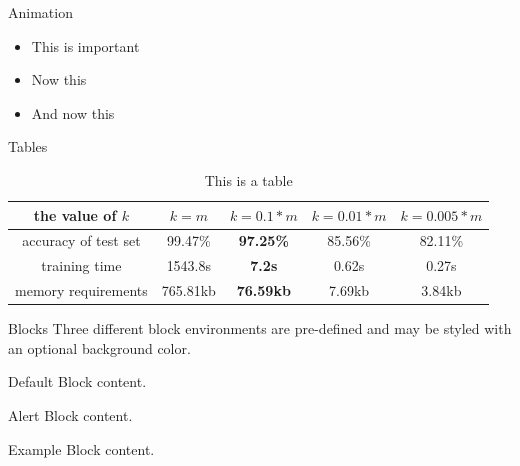 \documentclass[10pt]{beamer}
\begin{document}
\begin{frame}{Animation}
  \begin{itemize}[<+- | alert@+>] %
  
    \item This is important
    \item Now this
    \item And now this
    
  \end{itemize}
\end{frame}




\begin{frame}{Tables}
  
	\begin{table}[tbp]
	\centering  
	\begin{tabular}{c|c|c|c|c}
		\hline
		the value of $k$ &$k=m$ &$k=0.1*m$ &$k=0.01*m$ &$k=0.005*m$\\ 
		\hline  
		accuracy of test set &99.47\% &\textbf{97.25\%} &85.56\% &82.11\%\\     
		training time & 1543.8s &\textbf{7.2s} &0.62s & 0.27s \\
		memory requirements & 765.81kb & \textbf{76.59kb} & 7.69kb & 3.84kb \\    
		\hline
	\end{tabular}
	\caption{This is a table}
	\end{table}

\end{frame}



\begin{frame}{Blocks}
  Three different block environments are pre-defined and may be styled with an
  optional background color.


      \begin{block}{Default}
        Block content.
      \end{block}

      \begin{alertblock}{Alert}
        Block content.
      \end{alertblock}

      \begin{exampleblock}{Example}
        Block content.
      \end{exampleblock}

\end{frame}
\end{document}
